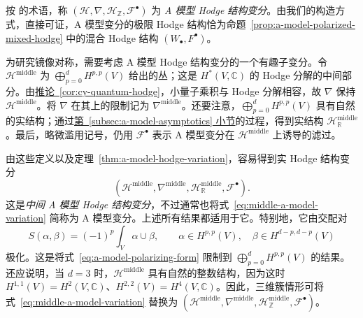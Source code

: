 按  的术语，称 $(\mathcal H,\nabla,\mathcal H_{\mathbb Z},\mathcal F^\bullet)$ 为 \emph{A 模型 Hodge 结构变分}。由我们的构造方式，直接可证，A 模型变分的极限 Hodge 结构恰为命题~\ref{prop:a-model-polarized-mixed-hodge} 中的混合 Hodge 结构 $(W_\bullet,F^\bullet)$。

为研究镜像对称，需要考虑 A 模型 Hodge 结构变分的一个有趣子变分。令 $\mathcal H^{\mathrm{middle}}$ 为 $\bigoplus_{p=0}^dH^{p,p}(V)$ 给出的丛；这是 $H^*(V,\mathbb C)$ 的 Hodge 分解的中间部分。由\hyperref[cor:cy-quantum-hodge]{推论~\ref*{cor:cy-quantum-hodge}}，小量子乘积与 Hodge 分解相容，故 $\nabla$ 保持 $\mathcal H^{\mathrm{middle}}$。将 $\nabla$ 在其上的限制记为 $\nabla^{\mathrm{middle}}$。还要注意，$\bigoplus_{p=0}^dH^{p,p}(V)$ 具有自然的实结构；通过\hyperref[subsec:a-model-asymptotics]{第~\ref*{subsec:a-model-asymptotics} 小节}的过程，得到实结构 $\mathcal H^{\mathrm{middle}}_{\mathbb R}$。最后，略微滥用记号，仍用 $\mathcal F^\bullet$ 表示 A 模型变分在 $\mathcal H^{\mathrm{middle}}$ 上诱导的滤过。

由这些定义以及定理~\ref{thm:a-model-hodge-variation}，容易得到实 Hodge 结构变分
\begin{equation}\label{eq:middle-a-model-variation}
(\mathcal H^{\mathrm{middle}},\nabla^{\mathrm{middle}},\mathcal H^{\mathrm{middle}}_{\mathbb R},\mathcal F^\bullet).
\end{equation}
这是\emph{中间 A 模型 Hodge 结构变分}，不过通常也将式~\eqref{eq:middle-a-model-variation} 简称为 A 模型变分。上述所有结果都适用于它。特别地，它由交配对
\begin{equation}\label{eq:middle-a-model-polarization}
S(\alpha,\beta)=(-1)^p\int_V\alpha\cup\beta,
\qquad\alpha\in H^{p,p}(V),\quad\beta\in H^{d-p,d-p}(V)
\end{equation}
极化。这是将式~\eqref{eq:a-model-polarizing-form} 限制到 $\bigoplus_{p=0}^dH^{p,p}(V)$ 的结果。还应说明，当 $d=3$ 时，$\mathcal H^{\mathrm{middle}}$ 具有自然的整数结构，因为这时 $H^{1,1}(V)=H^2(V,\mathbb C)$、$H^{2,2}(V)=H^4(V,\mathbb C)$。因此，三维簇情形可将式~\eqref{eq:middle-a-model-variation} 替换为 $(\mathcal H^{\mathrm{middle}},\nabla^{\mathrm{middle}},\mathcal H^{\mathrm{middle}}_{\mathbb Z},\mathcal F^\bullet)$。

